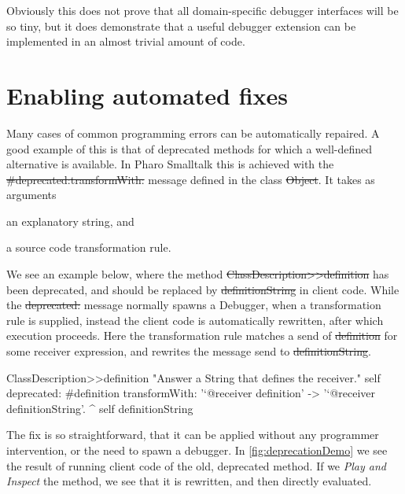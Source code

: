 \documentclass[sigplan,anonymous,review,10pt]{acmart}
\begin{document}

Obviously this does not prove that all domain-specific debugger interfaces will be so tiny, but it does demonstrate that a useful debugger extension can be implemented in an almost trivial amount of code.

\section{Enabling automated fixes}\label{sec:fixes}

Many cases of common programming errors can be automatically repaired.
A good example of this is that of deprecated methods for which a well-defined alternative is available.
In Pharo Smalltalk this is achieved with the \st{#deprecated:transformWith:} message defined in the class \st{Object}.
It takes as arguments
\begin{inparaenum}[(i)]
	\item an explanatory string, and
	\item a source code transformation rule.
\end{inparaenum}    
We see an example below, where the method \st{ClassDescription>>definition} has been deprecated, and should be replaced by \st{definitionString} in client code.
While the \st{deprecated:} message normally spawns a Debugger, when a transformation rule is supplied, instead the client code is automatically rewritten, after which execution proceeds.
Here the transformation rule matches a send of \st{definition} for some receiver expression, and rewrites the message send to \st{definitionString}.

\begin{code}
ClassDescription>>definition
	"Answer a String that defines the receiver."
	self
		deprecated: #definition
		transformWith: '`@receiver definition' -> '`@receiver definitionString'.
	^ self definitionString
\end{code}

The fix is so straightforward, that it can be applied without any programmer intervention, or the need to spawn a debugger.
In \autoref{fig:deprecationDemo} we see the result of running client code of the old, deprecated method.
If we \emph{Play and Inspect} the method, we see that it is rewritten, and then directly evaluated.
\end{document}
